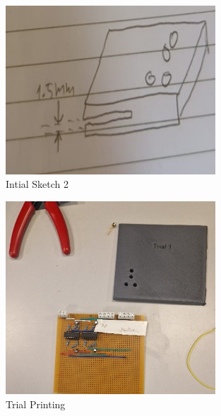             \begin{figure}[htbp]
                \centering
                \includegraphics[width=0.7\textwidth]{figures/Appendix-CAD/IntialSketch2.jpg}
                \caption*{Intial Sketch 2} 
                \label{fig:inital-sketch-2}
                \end{figure}

                \begin{figure}[htbp]
                    \centering
                    \includegraphics[width=0.7\textwidth]{figures/Appendix-CAD/Trial1.jpg}
                    \caption*{Trial Printing} 
                    \label{fig:trialprint}
                    \end{figure}
                
